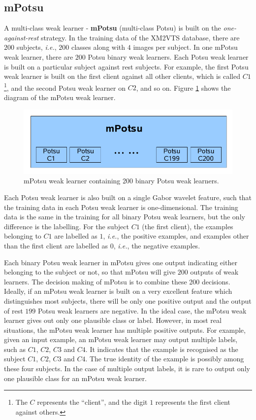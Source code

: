 \subsection{mPotsu}
A multi-class weak learner - \textbf{mPotsu} (multi-class Potsu) is built on the \textit{one-against-rest }strategy. In the training data of the \mbox{XM2VTS} database, there are $200$ subjects,\textit{ i.e.}, $200$ classes along with $4$ images per subject. In one mPotsu weak learner, there are $200$ Potsu binary weak learners. Each Potsu weak learner is built on a particular subject against rest subjects. For example, the first Potsu weak learner is built on the first client against all other clients, which is called $C1$\footnote{The $C$ represents the ``client'', and the digit $1$ represents the first client against others.}, and the second Potsu weak learner on $C2$, and so on. \mbox{Figure} \ref{fig:mpotsu} shows the diagram of the mPotsu weak learner.
\begin{figure}[ht]
 \begin{center}
  \includegraphics[width=\columnwidth]{ch5/figures/mPotsu.png}
  \caption{ mPotsu weak learner containing 200 binary Potsu weak learners.}
  \label{fig:mpotsu}
 \end{center}
\end{figure} 
Each Potsu weak learner is also built on a single Gabor wavelet feature, such that the training data in each Potsu weak learner is one-dimensional. The training data is the same in the training for all binary Potsu weak learners, but the only difference is the labelling. For the subject $C1$ (the first client), the examples belonging to $C1$ are labelled as $1$, \textit{i.e.}, the positive examples, and examples other than the first client are labelled as $0$, \textit{i.e.}, the negative examples.

Each binary Potsu weak learner in mPotsu gives one output indicating either belonging to the subject or not, so that mPotsu will give $200$ outputs of weak learners. The decision making of mPotsu is to combine these 200 decisions. Ideally, if an mPotsu weak learner is built on a very excellent feature which distinguishes most subjects, there will be only one positive output and the output of rest $199$ Potsu weak learners are negative. In the ideal case, the mPotsu weak learner gives out only one plausible class or label. However, in most real situations, the mPotsu weak learner has multiple positive outputs. For example, given an input example, an mPotsu weak learner may output multiple labels, such as $C1$, $C2$, $C3$ and $C4$. It indicates that the example is recognised as the subject $C1$, $C2$, $C3$ and $C4$. The true identity of the example is possibly among these four subjects. In the case of multiple output labels, it is rare to output only one plausible class for an mPotsu weak learner.

